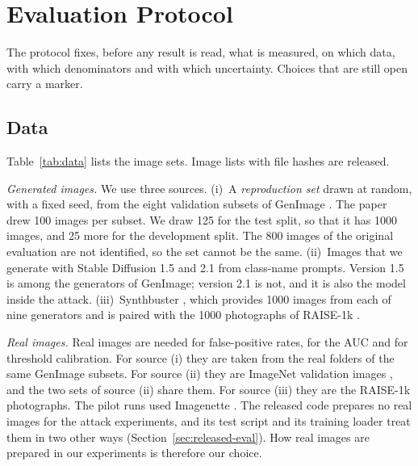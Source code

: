 \section{Evaluation Protocol}
\label{sec:protocol}

The protocol fixes, before any result is read, what is measured, on which data, with which
denominators and with which uncertainty. Choices that are still open carry a marker.

\subsection{Data}
\label{sec:data}

Table~\ref{tab:data} lists the image sets. Image lists with file hashes are released.

\emph{Generated images.} We use three sources.
(i)~A \emph{reproduction set} drawn at random, with a fixed seed, from the eight validation subsets
of GenImage . The paper drew 100 images per subset. We draw 125 for the test
split, so that it has 1000 images, and 25 more for the development split. The 800 images of the
original evaluation are not identified, so the set cannot be the same.
(ii)~Images that we generate with Stable Diffusion 1.5 and 2.1 from class-name prompts. Version
1.5 is among the generators of GenImage; version 2.1 is not, and it is also the model inside the
attack.
(iii)~Synthbuster , which provides 1000 images from each of nine
generators and is paired with the 1000 photographs of RAISE-1k .

\emph{Real images.} Real images are needed for false-positive rates, for the AUC and for threshold
calibration. For source (i) they are taken from the real folders of the same GenImage subsets. For
source (ii) they are ImageNet validation images , and the two sets of
source (ii) share them. For source (iii) they are the RAISE-1k photographs. The pilot runs used
Imagenette . The released code prepares no real images for the attack
experiments, and its test script and its training loader treat them in two other ways
(Section~\ref{sec:released-eval}). How real images are prepared in our experiments is therefore
our choice.

